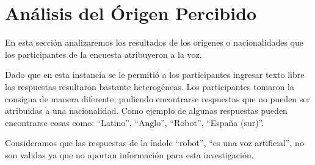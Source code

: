 




\clearpage
\section{Análisis del Órigen Percibido}

En esta sección analizaremos los resultados de los origenes o nacionalidades que los participantes de la encuesta atribuyeron a la voz.

Dado que en esta instancia se le permitió a los participantes ingresar texto libre las respuestas resultaron bastante heterogéneas. Los participantes tomaron la consigna de manera diferente, pudiendo encontrarse respuestas que no pueden ser atribuidas a una nacionalidad. Como ejemplo de algunas respuestas pueden encontrarse cosas como: ``Latino'', ``Anglo'', ``Robot'', ``España (sur)''.

Consideramos que las respuestas de la índole ``robot'', ``es una voz artificial'', no son validas ya que no aportan información para esta investigación.

